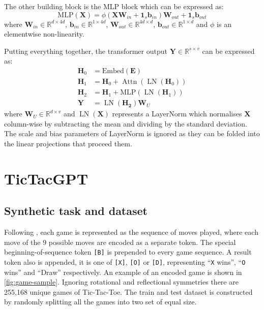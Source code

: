 \documentclass{article}
\newcommand{\ttgpt}{TicTacGPT\xspace}
\newcommand{\ttt}{Tic-Tac-Toe\xspace}
\renewcommand{\v}[1]{\mathbf{\bm{#1}}}
\newcommand{\m}[1]{\mathbf{\bm{#1}}}
\newcommand{\R}{\mathbb{R}}
\DeclareMathOperator{\layernorm}{LN}
\DeclareMathOperator{\attn}{Attn}
\begin{document}
The other building block is the MLP block which can be expressed as:
\begin{equation*}
    \text{MLP}(\m{X}) = \phi(
    \m{X} \m{W}_{in} + \v{1}_s \m{b}_{in}
    ) \m{W}_{out} + \v{1}_s \m{b}_{out}
\end{equation*}
where $\m{W}_{in} \in \R^{d \times 4d}$, $\v{b}_{in} \in \R^{1 \times 4d}$, $\m{W}_{out} \in \R^{4d \times d}$, $\v{b}_{out} \in \R^{1 \times d}$ and $\phi$ is an elementwise non-linearity.

Putting everything together, the transformer output $\m{Y} \in \R^{s \times v}$ can be expressed as:
\begin{equation*}
    \begin{aligned}
        \m{H}_0 & = \text{Embed}(\m{E})                       \\
        \m{H}_1 & = \m{H}_0 + \attn(\layernorm(\m{H}_0))      \\
        \m{H}_2 & = \m{H}_1 + \text{MLP}(\layernorm(\m{H}_1)) \\
        \m{Y}   & = \layernorm(\m{H_2}) \m{W}_U
    \end{aligned}
\end{equation*}
where $\m{W}_U \in \R^{d \times v}$ and $\layernorm(\m{X})$ represents a LayerNorm which normalises $\m{X}$ column-wise by subtracting the mean and dividing by the standard deviation. The scale and bias parameters of LayerNorm is ignored as they can be folded into the linear projections that proceed them.

\section{\ttgpt}

\subsection{Synthetic task and dataset}



Following \cite{orthello-gpt}, each game is represented as the sequence of moves played, where each move of the 9 possible moves are encoded as a separate token. The special beginning-of-sequence token \texttt{[B]} is prepended to every game sequence. A result token also is appended, it is one of \texttt{[X]}, \texttt{[O]} or \texttt{[D]}, representing ``\texttt{X} wins'', ``\texttt{O} wins'' and ``Draw'' respectively. An example of an encoded game is shown in \cref{fig:game-sample}. Ignoring rotational and reflectional symmetries there are 255,168 unique games of \ttt. The train and test dataset is constructed by randomly splitting all the games into two set of equal size.
\end{document}
